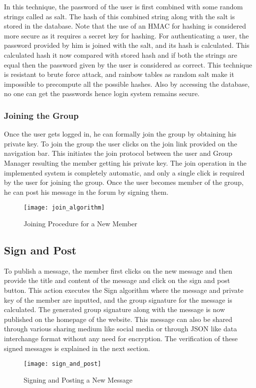 In this technique, the password of the user is first combined with some random strings called as salt. The hash of this combined string along with the salt is stored in the database. Note that the use of an HMAC for hashing is considered more secure as it requires a secret key for hashing. For authenticating a user, the password provided by him is joined with the salt, and its hash is calculated. This calculated hash it now compared with stored hash and if both the strings are equal then the password given by the user is considered as correct. This technique is resistant to brute force attack, and rainbow tables as random salt make it impossible to precompute all the possible hashes. Also by accessing the database, no one can get the passwords hence login system remains secure.

\subsubsection{Joining the Group}
Once the user gets logged in, he can formally join the group by obtaining his private key. To join the group the user clicks on the join link provided on the navigation bar. This initiates the join protocol between the user and Group Manager resulting the member getting his private key. The join operation in the implemented system is completely automatic, and only a single click is required by the user for joining the group. Once the user becomes member of the group, he can post his message in the forum by signing them.
\begin{figure}[!h]
    \centering
    \texttt{[image: join\_algorithm]}
    \caption{Joining Procedure for a New Member}
    \label{fig:Joining Procedure}
\end{figure}

\subsection{Sign and Post}
To publish a message, the member first clicks on the new message and then provide the title and content of the message and click on the sign and post button. This action executes the Sign algorithm where the message and private key of the member are inputted, and the group signature for the message is calculated. The generated group signature along with the message is now published on the homepage of the website. This message can also be shared through various sharing medium like social media or through JSON like data interchange format without any need for encryption. The verification of these signed messages is explained in the next section.
\begin{figure}[!h]
    \centering
    \texttt{[image: sign\_and\_post]}
    \caption{Signing and Posting a New Message}
    \label{fig:Signing and Posting a New Message}
\end{figure}

